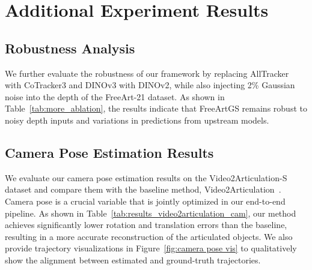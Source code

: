\section{Additional Experiment Results}

\subsection{Robustness Analysis}
We further evaluate the robustness of our framework by replacing AllTracker with CoTracker3 and DINOv3 with DINOv2, while also injecting 2\% Gaussian noise into the depth of the FreeArt-21 dataset. As shown in Table~\ref{tab:more_ablation}, the results indicate that FreeArtGS remains robust to noisy depth inputs and variations in predictions from upstream models.

\subsection{Camera Pose Estimation Results}
We evaluate our camera pose estimation results on the Video2Articulation-S dataset and compare them with the baseline method, Video2Articulation~\cite{video2articulation}. Camera pose is a crucial variable that is jointly optimized in our end-to-end pipeline. As shown in Table~\ref{tab:results_video2articulation_cam}, our method achieves significantly lower rotation and translation errors than the baseline, resulting in a more accurate reconstruction of the articulated objects.
We also provide trajectory visualizations in Figure~\ref{fig:camera pose vis} to qualitatively show the alignment between estimated and ground-truth trajectories.

\begin{table}[h]
    \centering
    \caption{Results of Camera Pose Estimation on the Video2Articulation-S Dataset. * indicates that the results are taken from the original paper.}
    \label{tab:results_video2articulation_cam}
    \renewcommand\tabcolsep{7pt}
\end{table}

